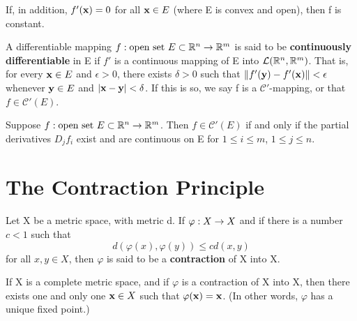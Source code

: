 \begin{corollary}
  \label{cor:chap9:zero_derivative_implies_constant}
  If, in addition, $f'(\mathbf{x}) = 0$ for all $\mathbf{x} \in E$ (where
  E is convex and open), then f is constant.
\end{corollary}

\begin{definition}
  \label{def:chap9:continuously_differentiable}
  A differentiable mapping $f: \text{open set } E \subset
  \mathbb{R}^n \to \mathbb{R}^m$ is said to be \textbf{continuously differentiable} in
  E if $f'$ is a continuous mapping of E into $\mathcal{L}(\mathbb{R}^n,
  \mathbb{R}^m)$. That is, for every $\mathbf{x} \in E$ and $\epsilon > 0$,
  there exists $\delta > 0$ such that $\left\lVert f'(\mathbf{y}) -
  f'(\mathbf{x}) \right\rVert < \epsilon$ whenever $\mathbf{y} \in E$ and $|\mathbf{x}
  - \mathbf{y}| < \delta$.
  If this is so, we say f is a $\mathcal{C}'$-mapping, or that $f \in
  \mathcal{C}'(E)$.
\end{definition}

\begin{theorem}
  \label{thm:chap9:C1_iff_continuous_partials}
  Suppose $f: \text{open set } E \subset \mathbb{R}^n \to \mathbb{R}^m$. Then $f
  \in \mathcal{C}'(E)$ if and only if the partial derivatives $D_j
  f_i$ exist and are continuous on E for $1 \le i \le m$, $1 \le j \le n$.
\end{theorem}



\section{The Contraction Principle}

\begin{definition}
  \label{def:chap9:contraction_mapping}
  Let X be a metric space, with metric d. If $\varphi: X \to X$
  and if there is a number $c < 1$ such that
  \[
    d(\varphi(x), \varphi(y)) \le c d(x, y)
  \]
  for all $x, y \in X$, then $\varphi$ is said to be a
  \textbf{contraction} of X into X.
\end{definition}

\begin{theorem}
  \label{thm:chap9:contraction_mapping_thm}
  If X is a complete metric space, and if $\varphi$ is a contraction
  of X into X, then there exists one and only one $\mathbf{x} \in X$
  such that $\varphi(\mathbf{x}) = \mathbf{x}$. (In other words,
  $\varphi$ has a unique fixed point.)
\end{theorem}

